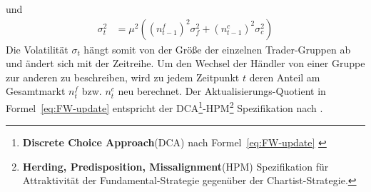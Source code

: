 \documentclass[ngerman]{ttlab-qualify}
\begin{document}
und
\begin{align}
\label{eq:FW-vol}
\sigma_t^2 &= \mu^2((n_{t-1}^f)^2\sigma_f^2 + (n_{t-1}^c)^2\sigma_c^2)
\end{align}
Die Volatilität $\sigma_t$ hängt somit von der Größe der einzelnen Trader-Gruppen ab und ändert sich mit der Zeitreihe. Um den Wechsel der Händler von einer Gruppe zur anderen zu beschreiben, wird zu jedem Zeitpunkt $t$ deren Anteil am Gesamtmarkt  $n_t^f$ bzw. $n_t^c$ neu berechnet.
Der Aktualisierungs-Quotient in Formel~\ref{eq:FW-update} entspricht der DCA\footnote{\textbf{Discrete Choice Approach}(DCA) nach Formel~\ref{eq:FW-update} \parencite{bertschinger:2018}}-HPM\footnote{\textbf{Herding, Predisposition, Missalignment}(HPM) Spezifikation für Attraktivität der Fundamental-Strategie gegenüber der Chartist-Strategie\parencite{bertschinger:2018}.} Spezifikation nach \parencite{bertschinger:2018, FW:2011}.\\
\end{document}
